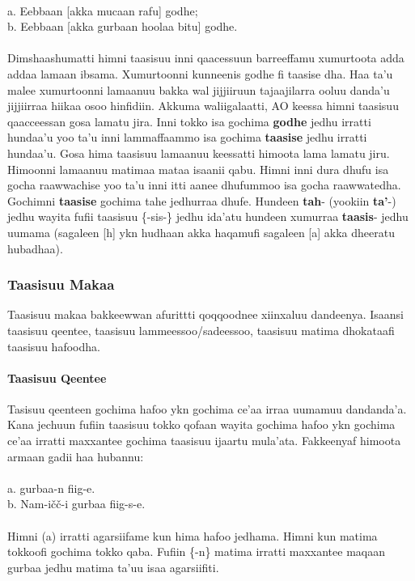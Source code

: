 \documentclass[11pt,b5paper]{book}
\begin{document}
\\
a. Eebbaan [akka mucaan rafu] godhe; \\
b. Eebbaan [akka gurbaan hoolaa bitu] godhe.\\
\\
Dimshaashumatti himni taasisuu inni qaacessuun barreeffamu xumurtoota adda addaa lamaan ibsama. Xumurtoonni kunneenis godhe fi taasise dha. Haa ta’u malee xumurtoonni lamaanuu bakka wal jijjiiruun tajaajilarra ooluu danda’u jijjiirraa hiikaa osoo hinfidiin. Akkuma waliigalaatti, AO keessa
himni taasisuu qaacceessan gosa lamatu jira. Inni tokko isa gochima \textbf{godhe} jedhu irratti hundaa’u yoo ta’u inni lammaffaammo isa gochima \textbf{taasise} jedhu irratti hundaa’u.
Gosa hima taasisuu lamaanuu keessatti himoota lama lamatu jiru. Himoonni lamaanuu matimaa mataa isaanii qabu. Himni inni dura dhufu isa gocha raawwachise yoo ta’u inni itti aanee dhufummoo isa gocha raawwatedha. Gochimni \textbf{taasise} gochima tahe jedhurraa dhufe. Hundeen \textbf{tah}- (yookiin \textbf{ta’}-) jedhu wayita fufii taasisuu \{-sis-\} jedhu ida’atu hundeen xumurraa \textbf{taasis}- jedhu uumama (sagaleen [h] ykn hudhaan akka haqamufi sagaleen [a] akka dheeratu hubadhaa). 

\subsubsection{Taasisuu Makaa}
Taasisuu makaa  bakkeewwan afurittti qoqqoodnee xiinxaluu dandeenya. Isaansi taasisuu qeentee, taasisuu lammeessoo/sadeessoo, taasisuu matima dhokataafi taasisuu hafoodha. 

\paragraph{Taasisuu Qeentee}

Tasisuu qeenteen  gochima hafoo ykn gochima ce’aa irraa uumamuu dandanda’a. Kana jechuun fufiin taasisuu tokko qofaan wayita gochima hafoo ykn gochima ce’aa irratti maxxantee gochima taasisuu ijaartu mula’ata. Fakkeenyaf himoota armaan gadii haa hubannu:\\
\\
a. gurbaa-n fiig-e.\\
b. Nam-ičč-i gurbaa fiig-s-e.\\
\\
Himni (a) irratti agarsiifame kun hima hafoo jedhama. Himni kun matima tokkoofi gochima tokko qaba. Fufiin \{-n\} matima irratti maxxantee maqaan gurbaa jedhu matima ta’uu isaa agarsiifiti. 
\end{document}
